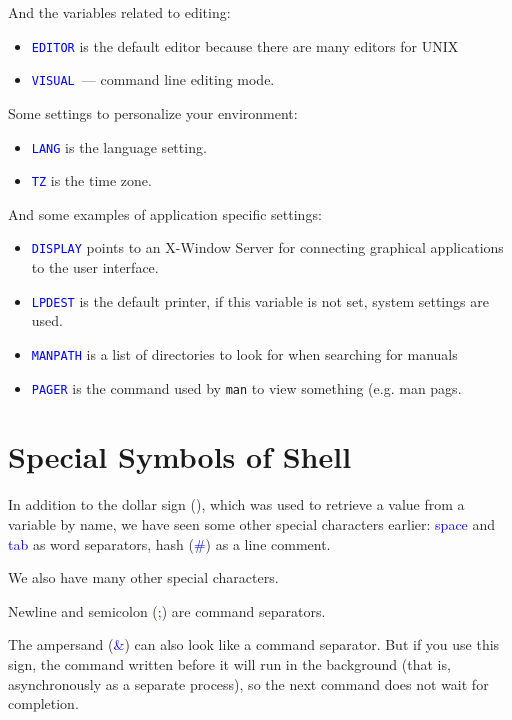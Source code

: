 \documentclass[12pt]{report}
\newcommand{\struct}[1]{\textcolor{blue}{#1}}
\begin{document}
\medskip
And the variables related to editing:
\begin{itemize}
\item \struct{\tt EDITOR} is the default editor because there are
      many editors for UNIX%
\item \struct{\tt VISUAL}~--- command line editing mode.
\end{itemize}

\medskip
Some settings to personalize your environment:
\begin{itemize}
\item \struct{\tt LANG} is the language setting.
\item \struct{\tt TZ} is the time zone.
\end{itemize}

\medskip
And some examples of application specific settings:
\begin{itemize}
\item \struct{\tt DISPLAY} points to an X-Window Server for connecting
      graphical applications to the user interface.
\item \struct{\tt LPDEST} is the default printer, if this variable is not
      set, system settings are used.
\item \struct{\tt MANPATH} is a list of directories to look for when
      searching for manuals%
\item \struct{\tt PAGER} is the command used by {\tt man} to view something%
      (e.g. man pags.%
\end{itemize}

\section*{Special Symbols of Shell}

In addition to the dollar sign (\struct{\textdollar}), which was used
to retrieve a value from a variable by name, we have seen some other special
characters earlier: \struct{space} and \struct{tab} as word separators,
hash (\struct{\#}) as a line comment.

\medskip
We also have many other special characters.

\medskip
Newline and semicolon (\struct{;}) are command separators.

\medskip
The ampersand (\struct{\&}) can also look like a command separator.
But if you use this sign, the command written before it will run in
the background (that is, asynchronously as a separate process),
so the next command does not wait for completion.
\end{document}
